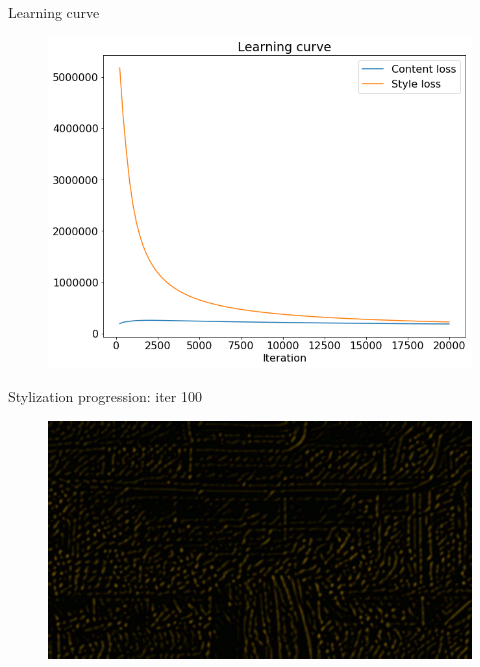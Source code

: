 \documentclass{beamer}
\begin{document}
    \begin{frame}{Learning curve}

        \begin{figure}
            \includegraphics[width=\textwidth]{learningcurve}
        \end{figure}

    \end{frame}

    \begin{frame}{Stylization progression: iter 100}

        \begin{figure}
            \includegraphics[width=\textwidth]{progression-0}
        \end{figure}

    \end{frame}
\end{document}
